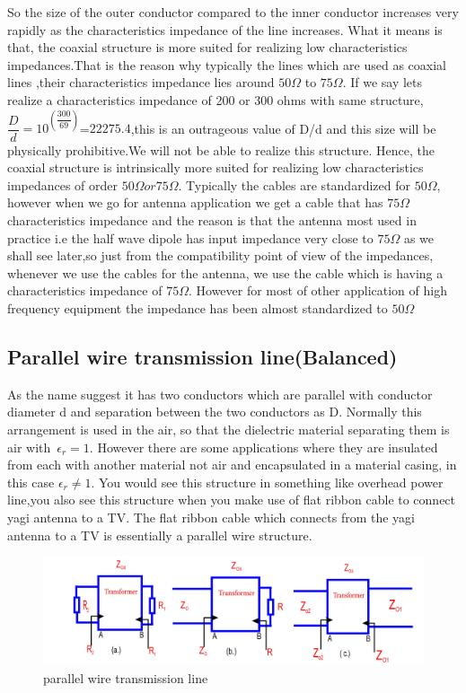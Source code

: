 So the size of the outer conductor compared to the inner conductor increases very rapidly as the characteristics impedance of the line increases. What it means is that, the coaxial structure is more suited for realizing low characteristics impedances.That is the reason why typically the lines which are used as coaxial lines ,their characteristics impedance lies around $50\Omega$ to $75\Omega$. If we say lets realize a characteristics impedance of 200 or 300 ohms with same structure, $\dfrac{D}{d}=10^{(\dfrac{300}{69})}$=$22275.4$,this is an outrageous value of D/d and this size will be physically prohibitive.We will not be able to realize this structure. Hence, the coaxial structure is intrinsically more suited for realizing low characteristics impedances of order $50\Omega or 75\Omega$. Typically the cables are standardized for $50\Omega$, however when we go for antenna application we get a cable that has $75\Omega$ characteristics impedance  and the reason is that the antenna most used in practice i.e the half wave dipole has input impedance very close to $75\Omega$ as we shall see later,so just from the compatibility point of view of the impedances, whenever we use the cables for the antenna, we use the cable which is having a characteristics impedance of $75\Omega$. However for most of other application of high frequency equipment the impedance has been almost standardized to $50\Omega$

\subsection{Parallel wire transmission line(Balanced)} 
As the name suggest it has two conductors which are parallel with conductor diameter d and separation between the two conductors as D. Normally this arrangement is used in the air, so that the dielectric material separating them is air with\ $\epsilon_r=1$. However  there are some applications where they are insulated from each with another material not air and encapsulated in a material casing, in this case $\epsilon_r\neq1$. You would see this structure in something like overhead power line,you also see this structure when you make use of flat ribbon cable to connect yagi antenna to a TV. The flat ribbon cable which connects from the yagi antenna to a TV is essentially a parallel wire structure.
\begin{figure}[h]
\centering
\includegraphics[width=1\linewidth]{./graphics/fig8}
\caption{parallel wire transmission line}
\end{figure}



